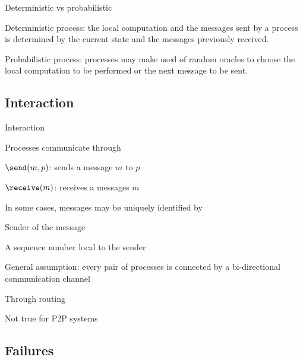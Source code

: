 \begin{frame}{Deterministic vs probabilistic}

\BIL
\item \alert{Deterministic process}: the local computation and the messages
  sent by a process is determined by the current state and the messages 
  previously received.
\item \alert{Probabilistic process}: processes may make used of \alert{random}
  oracles to choose the local computation to be performed or the next
  message to be sent.
\EIL

\end{frame}

\subsection{Interaction}

\begin{frame}{Interaction}
	
	
\BIL
\item Processes communicate through 
  \BI 
  \item $\send(m,p)$: sends a message $m$ to $p$
  \item $\receive(m)$: receives a messages $m$ 
  \EI
\item In some cases, messages may be uniquely identified by
  \BI 
  \item Sender of the message
  \item A sequence number local to the sender
  \EI
\item General assumption: every pair of processes is connected by a bi-directional \alert{communication channel}
\BI
\item Through routing
\item Not true for P2P systems
\EI
\EIL
\end{frame}

\subsection{Failures}

